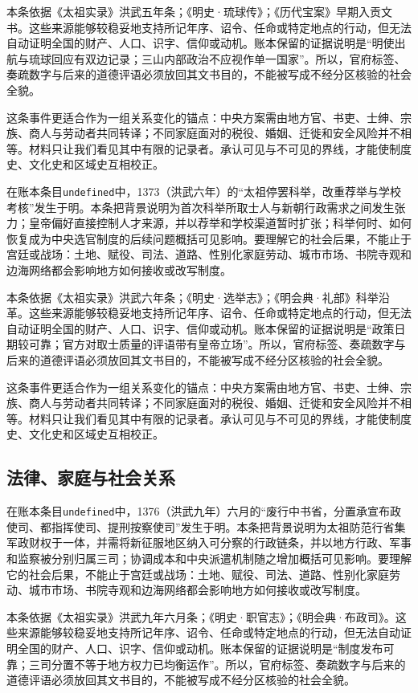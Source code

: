 本条依据《太祖实录》洪武五年条；《明史·琉球传》；《历代宝案》早期入贡文书。这些来源能够较稳妥地支持所记年序、诏令、任命或特定地点的行动，但无法自动证明全国的财产、人口、识字、信仰或动机。账本保留的证据说明是“明使出航与琉球回应有双边记录；三山内部政治不应视作单一国家”。所以，官府标签、奏疏数字与后来的道德评语必须放回其文书目的，不能被写成不经分区核验的社会全貌。

这条事件更适合作为一组关系变化的锚点：中央方案需由地方官、书吏、士绅、宗族、商人与劳动者共同转译；不同家庭面对的税役、婚姻、迁徙和安全风险并不相等。材料只让我们看见其中有限的记录者。承认可见与不可见的界线，才能使制度史、文化史和区域史互相校正。

在账本条目\texttt{undefined}中，1373（洪武六年）的“太祖停罢科举，改重荐举与学校考核”发生于明。本条把背景说明为首次科举所取士人与新朝行政需求之间发生张力；皇帝偏好直接控制人才来源，并以荐举和学校渠道暂时扩张；科举何时、如何恢复成为中央选官制度的后续问题概括可见影响。要理解它的社会后果，不能止于宫廷或战场：土地、赋役、司法、道路、性别化家庭劳动、城市市场、书院寺观和边海网络都会影响地方如何接收或改写制度。

本条依据《太祖实录》洪武六年条；《明史·选举志》；《明会典·礼部》科举沿革。这些来源能够较稳妥地支持所记年序、诏令、任命或特定地点的行动，但无法自动证明全国的财产、人口、识字、信仰或动机。账本保留的证据说明是“政策日期较可靠；官方对取士质量的评语带有皇帝立场”。所以，官府标签、奏疏数字与后来的道德评语必须放回其文书目的，不能被写成不经分区核验的社会全貌。

这条事件更适合作为一组关系变化的锚点：中央方案需由地方官、书吏、士绅、宗族、商人与劳动者共同转译；不同家庭面对的税役、婚姻、迁徙和安全风险并不相等。材料只让我们看见其中有限的记录者。承认可见与不可见的界线，才能使制度史、文化史和区域史互相校正。

\subsection{法律、家庭与社会关系}

在账本条目\texttt{undefined}中，1376（洪武九年）六月的“废行中书省，分置承宣布政使司、都指挥使司、提刑按察使司”发生于明。本条把背景说明为太祖防范行省集军政财权于一体，并需将新征服地区纳入可分察的行政链条，并以地方行政、军事和监察被分别归属三司；协调成本和中央派遣机制随之增加概括可见影响。要理解它的社会后果，不能止于宫廷或战场：土地、赋役、司法、道路、性别化家庭劳动、城市市场、书院寺观和边海网络都会影响地方如何接收或改写制度。

本条依据《太祖实录》洪武九年六月条；《明史·职官志》；《明会典·布政司》。这些来源能够较稳妥地支持所记年序、诏令、任命或特定地点的行动，但无法自动证明全国的财产、人口、识字、信仰或动机。账本保留的证据说明是“制度发布可靠；三司分置不等于地方权力已均衡运作”。所以，官府标签、奏疏数字与后来的道德评语必须放回其文书目的，不能被写成不经分区核验的社会全貌。

